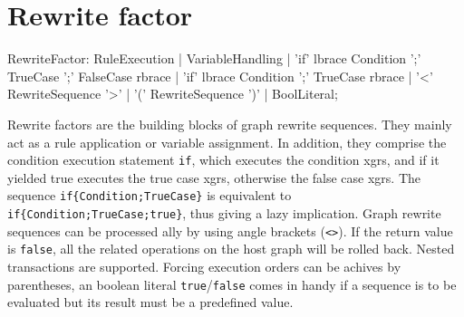 \section{Rewrite factor}

\begin{rail} 
  RewriteFactor: 
    RuleExecution |
    VariableHandling |
	'if' lbrace Condition ';' TrueCase ';' FalseCase rbrace |
	'if' lbrace Condition ';' TrueCase rbrace |
    '<' RewriteSequence '>' | 
    '(' RewriteSequence ')' |
    BoolLiteral;
\end{rail}\indexmain{\texttt{<>}}

Rewrite factors are the building blocks of graph rewrite sequences.
They mainly act as a rule application or variable assignment.
In addition, they comprise the condition execution statement \texttt{if}, which executes the condition xgrs, and if it yielded true executes the true case xgrs, otherwise the false case xgrs.
The sequence \verb#if{Condition;TrueCase}# is equivalent to \verb#if{Condition;TrueCase;true}#, thus giving a lazy implication.
Graph rewrite sequences can be processed ally by using angle brackets (\texttt{<>}).
If the return value is \texttt{false}, all the related operations on the host graph will be rolled back.
Nested transactions are supported.
Forcing execution orders can be achives by parentheses, an boolean literal \texttt{true}/\texttt{false} comes in handy if a sequence is to be evaluated but its result must be a predefined value.

